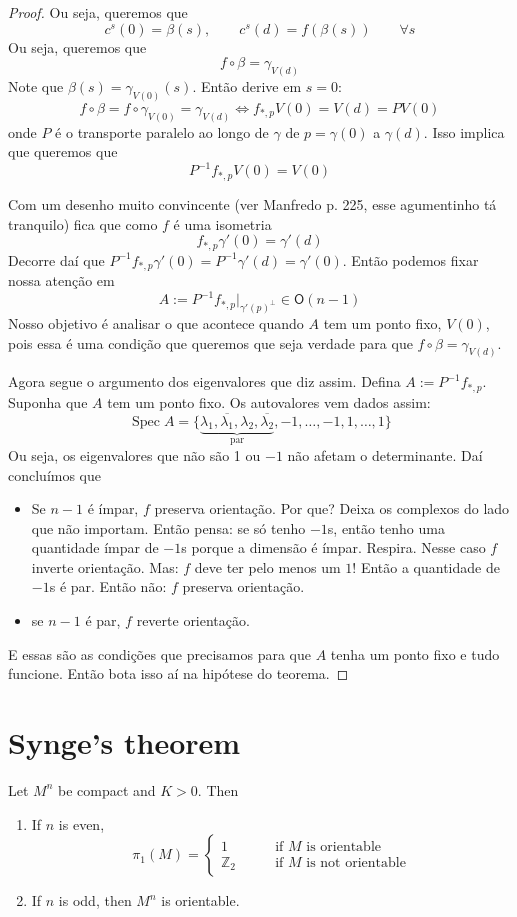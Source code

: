 \documentclass{book}
\begin{document}
\begin{proof}
Ou seja, queremos que
$$
c^s(0)=\beta(s),\qquad
c^s(d)=f(\beta(s))\qquad \forall s
$$
Ou seja, queremos que
$$
f \circ \beta=\gamma_{V(d)}
$$
Note que $\beta(s)=\gamma_{V(0)}(s)$. Então
derive em $s=0$: \[f \circ
\beta=f\circ\gamma_{V(0)}=\gamma_{V(d)}\iff
f_{*,p}V(0)=V(d)=PV(0)\] onde $P$ é
o transporte paralelo ao longo de $\gamma$ de
$p=\gamma(0)$ a $\gamma(d)$.  Isso
implica que queremos que
\[P^{-1}f_{*,p}V(0)=V(0)\]

Com um desenho muito convincente (ver
Manfredo p. 225, esse agumentinho tá
tranquilo) fica que como $f$ é uma isometria
\[f_{*,p}\gamma'(0)=\gamma'(d)\]
Decorre daí que
$P^{-1}f_{*,p}\gamma'(0)=P^{-1}\gamma'(d)=
\gamma'(0)$.
Então
podemos fixar nossa atenção em
$$
A:=P^{-1}f_{*,p}|_{\gamma'(p)^\perp}\in
\mathsf{O}(n-1)
$$
Nosso objetivo é analisar o que acontece
quando $A$ tem um ponto fixo, $V(0)$,
pois essa é uma condição que queremos que
seja verdade para que $f\circ \beta =
\gamma_{V(d)}$.

Agora segue o argumento dos eigenvalores que
diz assim. Defina
$A:=P^{-1}f_{*,p}$. Suponha que $A$ tem um
ponto fixo. Os autovalores vem dados
assim:
$$
\operatorname{Spec}A=\{\underbrace{\lambda_1,
\overline{\lambda_1},\lambda_2,
\overline{\lambda_2}}_{\text{par}
},-1,\ldots,-1,1,\ldots,1\}
$$
Ou seja, os eigenvalores que não são 1 ou
$-1$ não afetam o determinante. Daí
concluímos que
\begin{itemize}
\item Se $n-1$ é ímpar, $f$ preserva
orientação. Por que? Deixa os complexos do
lado que não importam. Então pensa: se só
tenho $-1$s, então tenho uma
quantidade ímpar de $-1$s porque a dimensão é
ímpar. Respira. Nesse caso $f$
inverte orientação. Mas: $f$ deve ter pelo
menos um $1$! Então a quantidade de
$-1$s  é par. Então não: $f$ preserva
orientação.
\item se $n-1$ é par, $f$ reverte orientação.
\end{itemize}
E essas são as condições que precisamos para
que $A$ tenha um ponto fixo e tudo
funcione. Então bota isso aí na hipótese do
teorema.
\end{proof}

\section{Synge's theorem}
\label{section-Synge-theorem}

\begin{theorem}[Synge]
\label{theorem-Synge}
Let $M^n$ be compact and $K>0$. Then
\begin{enumerate}
\item If $n$ is even,
$$
\pi_1(M)=\begin{cases}
	1\qquad & \text{if $M$ is orientable}\\
	\mathbb{Z}_2\qquad & \text{if $M$ is not
	orientable}
\end{cases}
$$
\item If $n$ is odd, then $M^n$ is
orientable.
\end{enumerate}
\end{theorem}
\end{document}
